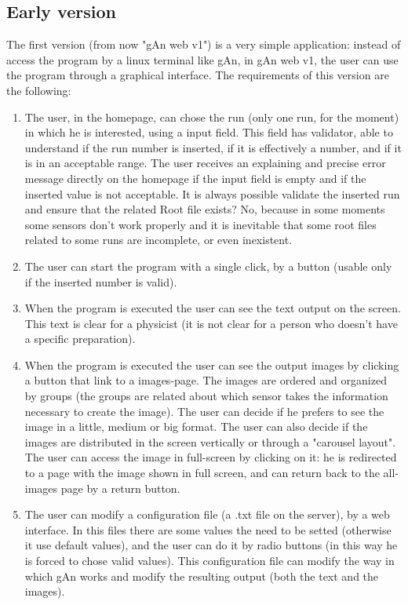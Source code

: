 \subsection{Early version}
The first version (from now "gAn web v1") is a very simple application: instead of access the program by a linux terminal like gAn, in gAn web v1, the user can 
use the program through a graphical interface. 
The requirements of this version are the following:
\begin{enumerate}

\item The user, in the homepage, can chose the run (only one run, for the moment) in which he is interested, using a input field. This field has validator, able to understand if the run number is inserted, if it is effectively a number, and if it is in an acceptable range. The user receives an explaining and precise error message directly on the homepage if the input field is empty and if the inserted value is not acceptable. It is always possible validate the inserted run and ensure that the related Root file exists? No, because in some moments some sensors don't work properly and it is inevitable that some root files related to some runs are incomplete, or even inexistent.

\item The user can start the program with a single click, by a button (usable only if the inserted number is valid).

\item When the program is executed the user can see the text output on the screen. This text is clear for a physicist (it is not clear for a person who doesn't have a specific preparation). 

\item When the program is executed the user can see the output images by clicking a button that link to a images-page. The images are ordered and organized by groups (the groups are related about which sensor takes the information necessary to create the image). The user can decide if he prefers to see the image in a little, medium or big format. The user can also decide if the images are distributed in the screen vertically or through a "carousel layout". The user can access the image in full-screen by clicking on it: he is redirected to a page with the image shown in full screen, and can return back to the all-images page by a return button. 

\item The user can modify a configuration file (a .txt file on the server), by a web interface. In this files there are some values the need to be setted (otherwise it use default values), and the user can do it by radio buttons (in this way he is forced to chose valid values). This configuration file can modify the way in which gAn works and modify the resulting output (both the text and the images).   

\end{enumerate}

